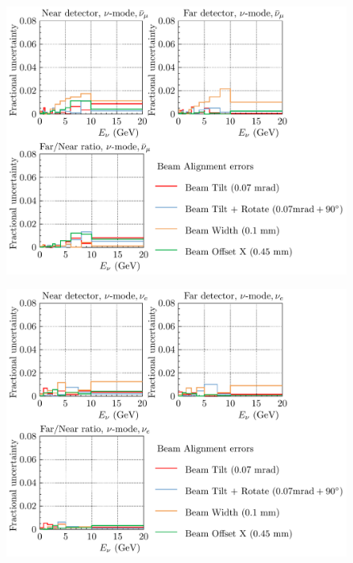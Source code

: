 \documentclass{article}
\begin{document}
\begin{figure}
  \includegraphics[width=\textwidth]{plots/fracerrs/numode_numubar_BeamAlignment}
  \caption{}
  \label{fig:beamalign_nu_numubar}
\end{figure}

\begin{figure}
  \includegraphics[width=\textwidth]{plots/fracerrs/numode_nue_BeamAlignment}
  \caption{}
  \label{fig:beamalign_nu_nue}
\end{figure}
\end{document}
